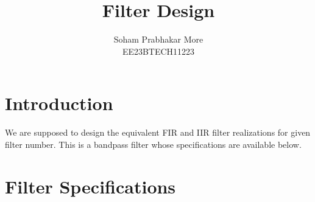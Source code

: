 \documentclass{article}
\begin{document}
\title{\textbf{Filter Design}}

\author{Soham Prabhakar More\\EE23BTECH11223}
\date{}

\maketitle
\section{Introduction}
We are supposed to design the equivalent FIR and IIR filter realizations for given filter number.
This is a bandpass filter whose specifications are available below.

\section{Filter Specifications}
\end{document}
